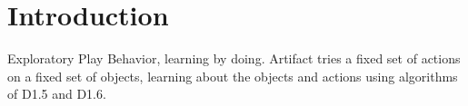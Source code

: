 
\section{Introduction}

Exploratory Play Behavior, learning by doing. Artifact tries a fixed
set of actions on a fixed set of objects, learning about the objects
and actions using algorithms of D1.5 and D1.6.

